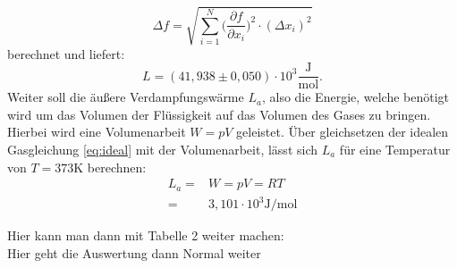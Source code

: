 \begin{equation}
  \Delta f = \sqrt{\sum_{i=1}^{N} \bigl(\frac{\partial f}{\partial x_i}\bigr)^2 \cdot
  (\Delta x_i)^2}
  \label{eqn:gauss}
\end{equation} %
berechnet und liefert:
\begin{equation*}
  L=(41,938 \pm 0,050)\cdot 10^3 \frac{\si{\joule}}{\si{\mol}}.
\end{equation*}
\newpage
Weiter soll die äußere Verdampfungswärme $L_a$, also die Energie, welche
benötigt wird um das Volumen der Flüssigkeit auf das Volumen des Gases
zu bringen. Hierbei wird eine Volumenarbeit $W=pV$ geleistet.
Über gleichsetzen der idealen Gasgleichung \eqref{eq:ideal} mit der
Volumenarbeit, lässt sich $L_a$ für eine Temperatur von $T=373 \si{\kelvin}$
berechnen:
\begin{align*}
  L_a =& W =pV=RT \\
      =& 3,101 \cdot 10^3 \si{\joule \per \mol}
\end{align*}

\newpage
Hier kann man dann mit Tabelle 2 weiter machen:
 \\
Hier geht die Auswertung dann Normal weiter
